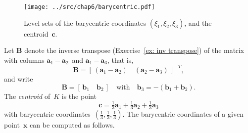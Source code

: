 \begin{figure}
\caption{Level sets of the barycentric coordinates 
$(\xi_1,\xi_2,\xi_3)$, and the centroid~$\boldsymbol{c}$.}
\label{fig: barycentric}
\begin{center}
\texttt{[image: ../src/chap6/barycentric.pdf]}
\end{center}
\end{figure}

Let $\boldsymbol{B}$ denote the inverse transpose 
(Exercise~\ref{ex: inv transpose}) of the matrix with columns 
$\boldsymbol{a}_1-\boldsymbol{a}_2$~and $\boldsymbol{a}_1-\boldsymbol{a}_3$,
that is,
\[
\boldsymbol{B}=[\,(\boldsymbol{a}_1-\boldsymbol{a}_2)\quad
    (\boldsymbol{a}_2-\boldsymbol{a}_3)\,]^{-T},
\]
and write
\begin{equation}\label{eq: bp vector def}
\boldsymbol{B}=[\,\boldsymbol{b}_1\quad\boldsymbol{b}_2\,]
\quad\text{with}\quad\boldsymbol{b}_3=-(\boldsymbol{b}_1+\boldsymbol{b}_2).
\end{equation}
The \emph{centroid} of~$K$ is the point
\[
\boldsymbol{c}=\tfrac13\boldsymbol{a}_1+\tfrac13\boldsymbol{a}_2
+\tfrac13\boldsymbol{a}_3
\]
with barycentric coordinates~$(\tfrac13,\tfrac13,\tfrac13)$. The barycentric 
coordinates of a given point~$\boldsymbol{x}$ can be computed as follows.

